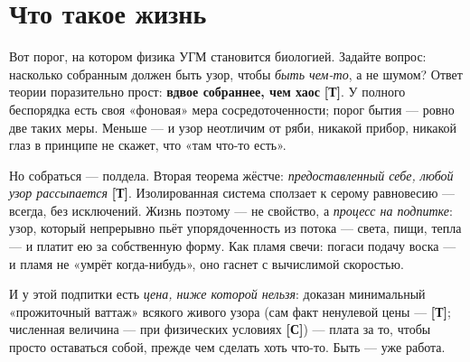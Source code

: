 \documentclass[11pt,letterpaper]{article}
\newcommand{\stT}{\textbf{[Т]}\xspace}
\newcommand{\stC}{\textbf{[С]}\xspace}
\begin{document}
\section{Что такое жизнь}
\label{sec:life}

Вот порог, на котором физика УГМ становится биологией. Задайте вопрос:
насколько собранным должен быть узор, чтобы \emph{быть чем-то}, а не
шумом? Ответ теории поразительно прост: \textbf{вдвое собраннее, чем
хаос} \stT. У полного беспорядка есть своя «фоновая» мера
сосредоточенности; порог бытия --- ровно две таких меры. Меньше ---
и узор неотличим от ряби, никакой прибор, никакой глаз в принципе не
скажет, что «там что-то есть».

Но собраться --- полдела. Вторая теорема жёстче: \emph{предоставленный
себе, любой узор рассыпается} \stT. Изолированная система сползает к
серому равновесию --- всегда, без исключений. Жизнь поэтому --- не
свойство, а \emph{процесс на подпитке}: узор, который непрерывно
пьёт упорядоченность из потока --- света, пищи, тепла --- и платит ею
за собственную форму. Как пламя свечи: погаси подачу воска --- и
пламя не «умрёт когда-нибудь», оно гаснет с вычислимой скоростью.

И у этой подпитки есть \emph{цена, ниже которой нельзя}: доказан
минимальный «прожиточный ваттаж» всякого живого узора (сам факт
ненулевой цены --- \stT; численная величина --- при физических
условиях \stC) --- плата
за то, чтобы просто оставаться собой, прежде чем сделать хоть что-то.
Быть --- уже работа.
\end{document}
